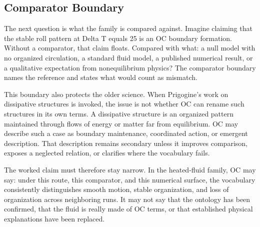 \documentclass[11pt,a4paper,openany]{book}
\begin{document}
\subsection{Comparator Boundary}
The next question is what the family is compared against. Imagine claiming that the stable roll pattern at Delta T equals 25 is an OC boundary formation. Without a comparator, that claim floats. Compared with what: a null model with no organized circulation, a standard fluid model, a published numerical result, or a qualitative expectation from nonequilibrium physics? The comparator boundary names the reference and states what would count as mismatch. \cite{landau_stat_physics,prigogine_dissipative}\par
This boundary also protects the older science. When Prigogine's work on dissipative structures is invoked, the issue is not whether OC can rename such structures in its own terms. A dissipative structure is an organized pattern maintained through flows of energy or matter far from equilibrium. OC may describe such a case as boundary maintenance, coordinated action, or emergent description. That description remains secondary unless it improves comparison, exposes a neglected relation, or clarifies where the vocabulary fails.\par
The worked claim must therefore stay narrow. In the heated-fluid family, OC may say: under this route, this comparator, and this numerical surface, the vocabulary consistently distinguishes smooth motion, stable organization, and loss of organization across neighboring runs. It may not say that the ontology has been confirmed, that the fluid is really made of OC terms, or that established physical explanations have been replaced.\par
\end{document}
